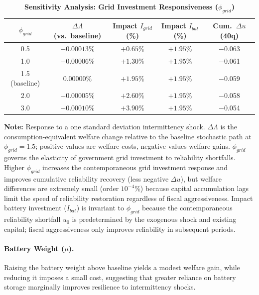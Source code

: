 	\begin{table}[H]
		\centering
		\caption[Sensitivity Analysis: Grid Investment Responsiveness]{\textbf{Sensitivity Analysis: Grid Investment Responsiveness ($\phi_{grid}$)}}
		\label{tab:phi_grid_sensitivity}
		\renewcommand{\arraystretch}{1.3}
		\small
		\begin{tabular}{c c c c c}
			\toprule
			$\phi_{grid}$ & \textbf{$\Delta\Lambda$ (vs.\ baseline)} & \textbf{Impact $I_{grid}$ (\%)} & \textbf{Impact $I_{bat}$ (\%)} & \textbf{Cum.\ $\Delta u$ (40q)} \\
			\midrule
			0.5 & $-0.00013\%$ & $+0.65\%$ & $+1.95\%$ & $-$0.063 \\
			1.0 & $-0.00006\%$ & $+1.30\%$ & $+1.95\%$ & $-$0.061 \\
			1.5 (baseline) & $0.00000\%$ & $+1.95\%$ & $+1.95\%$ & $-$0.059 \\
			2.0 & $+0.00005\%$ & $+2.60\%$ & $+1.95\%$ & $-$0.058 \\
			3.0 & $+0.00010\%$ & $+3.90\%$ & $+1.95\%$ & $-$0.054 \\
			\bottomrule
		\end{tabular}
		\vspace{0.2cm}
		\parbox{\textwidth}{\footnotesize \textbf{Note:} Response to a one standard deviation intermittency shock. $\Delta\Lambda$ is the consumption-equivalent welfare change relative to the baseline stochastic path at $\phi_{grid} = 1.5$; positive values are welfare costs, negative values welfare gains. $\phi_{grid}$ governs the elasticity of government grid investment to reliability shortfalls. Higher $\phi_{grid}$ increases the contemporaneous grid investment response and improves cumulative reliability recovery (less negative $\Delta u$), but welfare differences are extremely small (order $10^{-4}$\%) because capital accumulation lags limit the speed of reliability restoration regardless of fiscal aggressiveness. Impact battery investment ($I_{bat}$) is invariant to $\phi_{grid}$ because the contemporaneous reliability shortfall $u_0$ is predetermined by the exogenous shock and existing capital; fiscal aggressiveness only improves reliability in subsequent periods.}
	\end{table}

	\paragraph{Battery Weight ($\mu$).} Raising the battery weight above baseline yields a modest welfare gain, while reducing it imposes a small cost, suggesting that greater reliance on battery storage marginally improves resilience to intermittency shocks.

